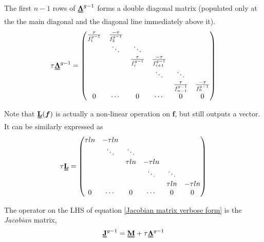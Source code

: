 \documentclass[a4paper, 12pt]{article}
\newcommand{\matr}[1]{\uuline{\bf{#1}}}
\newcommand{\ve}[1]{\boldsymbol{#1}}
\begin{document}
The first $n-1$ rows of $\matr{\Lambda}^{g-1}$ forms a double diagonal matrix (populated only at the the main diagonal and the diagonal line immediately above it).
\begin{align}
\tau \matr{\Lambda}^{g-1}=
\begin{pmatrix}
    \frac{\tau}{f^{g-1}_1} & \frac{-\tau}{f^{g-1}_2} &  &  & & \\
     & \ddots & \ddots &  & & \\
     &  & \frac{\tau}{f^{g-1}_i} & \frac{-\tau}{f^{g-1}_{i+1}} & & \\
     &  &  & \ddots & \ddots& \\
     &  &  &  & \frac{\tau}{f^{g-1}_{n-1}}& \frac{-\tau}{f^{g-1}_n}\\
   0 & \cdots & 0 & \cdots & 0 & 0 
\end{pmatrix}
\end{align}

Note that $\matr{L}(\ve{f})$ is actually a non-linear operation on $\ve{f}$, but still outputs a vector. It can be similarly expressed as
\begin{align}
\tau \matr{L}=
\begin{pmatrix}
    \tau ln & -\tau ln &  &  & & \\
     & \ddots & \ddots &  & & \\
     &  & \tau ln & -\tau ln & & \\
     &  &  & \ddots & \ddots& \\
     &  &  &  & \tau ln& -\tau ln\\
   0 & \cdots & 0 & \cdots & 0 & 0    
\end{pmatrix}
\end{align}

The operator on the LHS of equation \ref{Jacobian matrix verbose form} is the \emph{Jacobian} matrix,
\begin{align}
    \matr{J}^{g-1} = \matr{M} + \tau\matr{\Lambda}^{g-1}
    \label{Jacobian definition}
\end{align}
\end{document}
